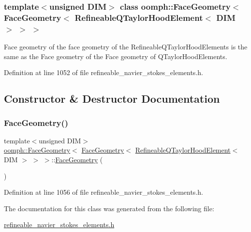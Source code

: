 \subsubsection*{template$<$unsigned D\+IM$>$\newline
class oomph\+::\+Face\+Geometry$<$ Face\+Geometry$<$ Refineable\+Q\+Taylor\+Hood\+Element$<$ D\+I\+M $>$ $>$ $>$}

Face geometry of the face geometry of the Refineable\+Q\+Taylor\+Hood\+Elements is the same as the Face geometry of the Face geometry of Q\+Taylor\+Hood\+Elements. 

Definition at line 1052 of file refineable\+\_\+navier\+\_\+stokes\+\_\+elements.\+h.



\subsection{Constructor \& Destructor Documentation}
\mbox{\label{classoomph_1_1FaceGeometry_3_01FaceGeometry_3_01RefineableQTaylorHoodElement_3_01DIM_01_4_01_4_01_4_ab4a9f36558b0394a30703106988a54d3}} 
\subsubsection{\texorpdfstring{Face\+Geometry()}{FaceGeometry()}}
{\footnotesize\ttfamily template$<$unsigned D\+IM$>$ \\
\hyperlink{classoomph_1_1FaceGeometry}{oomph\+::\+Face\+Geometry}$<$ \hyperlink{classoomph_1_1FaceGeometry}{Face\+Geometry}$<$ \hyperlink{classoomph_1_1RefineableQTaylorHoodElement}{Refineable\+Q\+Taylor\+Hood\+Element}$<$ D\+IM $>$ $>$ $>$\+::\hyperlink{classoomph_1_1FaceGeometry}{Face\+Geometry} (\begin{DoxyParamCaption}{ }\end{DoxyParamCaption})\hspace{0.3cm}{\ttfamily [inline]}}



Definition at line 1056 of file refineable\+\_\+navier\+\_\+stokes\+\_\+elements.\+h.



The documentation for this class was generated from the following file\+:\begin{DoxyCompactItemize}
\item 
\hyperlink{refineable__navier__stokes__elements_8h}{refineable\+\_\+navier\+\_\+stokes\+\_\+elements.\+h}\end{DoxyCompactItemize}

